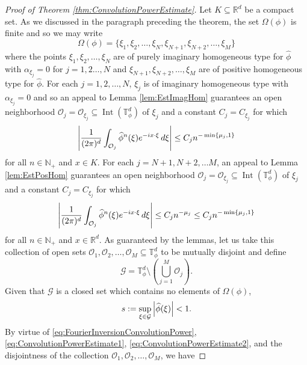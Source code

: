 \documentclass[11pt]{article}
\theoremstyle{remark}
\newcommand\Interior{\operatorname{Int}}
\begin{document}
\begin{proof}[Proof of Theorem \ref{thm:ConvolutionPowerEstimate}]
Let $K\subseteq\mathbb{R}^d$ be a compact set. As we discussed in the paragraph preceding the theorem, the set $\Omega(\phi)$ is finite and so we may write
\begin{equation*}
    \Omega(\phi)=\{\xi_1,\xi_2,\dots,\xi_N,\xi_{N+1},\xi_{N+2},\dots,\xi_M\}
\end{equation*}
where the points $\xi_1,\xi_2,\dots,\xi_N$ are of purely imaginary homogeneous type for $\widehat{\phi}$ with $\alpha_{\xi_j}=0$ for $j=1,2\dots,N$ and $\xi_{N+1},\xi_{N+2},\dots,\xi_M$ are of positive homogeneous type for $\widehat{\phi}$. For each $j=1,2,\dots,N$, $\xi_j$ is of imaginary homogeneous type with $\alpha_{\xi_j}=0$ and so an appeal to Lemma \ref{lem:EstImagHom} guarantees an open neighborhood $\mathcal{O}_j=\mathcal{O}_{\xi_j}\subseteq\Interior(\mathbb{T}_\phi^d)$ of $\xi_j$ and a constant $C_j=C_{\xi_j}$ for which
\begin{equation}\label{eq:ConvolutionPowerEstimate1}
    \abs{\frac{1}{(2\pi)^d}\int_{\mathcal{O}_j}\widehat{\phi}^n(\xi)e^{-ix\cdot\xi}\,d\xi}\leq C_j n^{-\min\{\mu_j,1\}}
\end{equation}
for all $n\in\mathbb{N}_+$ and $x\in K$. For each $j=N+1,N+2,\dots M$, an appeal to Lemma \ref{lem:EstPosHom} guarantees an open neighborhood $\mathcal{O}_j=\mathcal{O}_{\xi_j}\subseteq\Interior(\mathbb{T}_\phi^d)$ of $\xi_j$ and a constant $C_j=C_{\xi_j}$ for which 
\begin{equation}\label{eq:ConvolutionPowerEstimate2}
        \abs{\frac{1}{(2\pi)^d}\int_{\mathcal{O}_j}\widehat{\phi}^n(\xi)e^{-ix\cdot\xi}\,d\xi}\leq C_jn^{-\mu_j}\leq C_j n^{-\min\{\mu_j,1\}}
\end{equation}
for all $n\in\mathbb{N}_+$ and $x\in\mathbb{R}^d$. As guaranteed by the lemmas, let us take this collection of open sets $\mathcal{O}_1,\mathcal{O}_2,\dots,\mathcal{O}_M\subseteq\mathbb{T}_{\phi}^d$ to be mutually disjoint and define
\begin{equation}
    \mathcal{G}=\mathbb{T}_{\phi}^d\setminus\left(\bigcup_{j=1}^M \mathcal{O}_j\right).
\end{equation}
Given that $\mathcal{G}$ is a closed set which contains no elements of $\Omega(\phi)$,
\begin{equation*}
s:=\sup_{\xi\in\mathcal{G}}\abs{\widehat{\phi}(\xi)}<1.
\end{equation*}
By virtue of \eqref{eq:FourierInversionConvolutionPower}, \eqref{eq:ConvolutionPowerEstimate1}, \eqref{eq:ConvolutionPowerEstimate2}, and the disjointness of the collection $\mathcal{O}_1,\mathcal{O}_2,\dots,\mathcal{O}_M$, we have

\end{proof}
\end{document}
